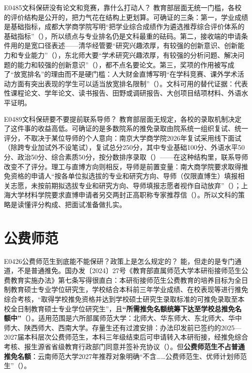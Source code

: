 \begin{qa}{E0485}{文科保研没有论文和竞赛，靠什么打动人？}
教育部层面无统一门槛，各校的评价结构是公开的，把力气花在结构上更划算。可确证的三条：第一，学业成绩是基础指标，成都大学商学院写明“把学业综合成绩作为遴选推荐综合评价体系的基础指标”（），所以绩点与专业排名仍是文科最重的砝码。第二，接收端的申请条件用的是宽口径表述——清华经管要“研究兴趣浓厚，有较强的创新意识、创新能力和专业能力”（），东北师大要“学术研究兴趣浓厚，有较强的分析问题、解决问题的能力和较强的创新意识”（），都不点名要论文。第三，奖项的作用被写成了“放宽排名”的理由而不是硬门槛：人大财金直博写明“在学科竞赛、课外学术活动方面有突出表现的学生可以适当放宽排名限制”（）。文科可用的替代证据：代表性课程论文、学年论文、读书报告、田野或调研报告、大创项目结项材料、外语水平证明。
\end{qa}

\begin{qa}{E0489}{文科保研要不要提前联系导师？}
教育部层面无规定，各校的录取机制决定了这件事的收益高低。可确证的是多数院系的推免录取由院系统一组织复试、统一评分，不取决于某位导师的个人意向：南京大学商学院2026年复试采用线下面试（除跨专业加试外不设笔试），复试总分250分，其中专业基础100分、外语水平50分、政治50分、综合素质50分，按分数排序录取（）——在这种结构里，联系导师改变不了评分。理工与直博方向则相反，导师是前置变量：南大商学院要求取得推免资格的申请人“按各单位拟选拔的专业和研究方向、导师（仅限直博生）填报相关志愿，未按前期拟选拔专业和研究方向、导师填报志愿者视作自动放弃”（）；上海大学材料学院要求直博申请者另交两封正高职称专家推荐信（）。所以文科的策略是读懂评分构成、把面试准备做扎实。
\end{qa}

\section{公费师范}
\begin{qa}{E0426}{公费师范生到底能不能保研？政策上是怎么规定的？}
能，但走的是专门通道，不是普通推免。国办发〔2024〕27号《教育部直属师范大学本研衔接师范生公费教育实施办法》第七条写得很直白：本研衔接师范生公费教育的培养目标为全日制教育硕士专业学位研究生，学校结合本科前三年学业成绩、在校表现等进行推免综合考核，“取得学校推免资格并达到学校硕士研究生录取标准的可推免录取至本校全日制教育硕士专业学位研究生”，且\textbf{“所需推免名额统筹下达至学校总推免名额中”}（）。适用范围是六所部属师范大学：北师大、华东师大、东北师大、华中师大、陕西师大、西南大学。存量生还有过渡安排：办法印发前已签约的2025—2027届本科层次公费师范生，本科三年级结束后可申请转入本研衔接，经推免综合考核、报生源省省级教育行政部门同意并签补充协议（）。但\textbf{公费师范生不占普通推免名额}：云南师范大学2027年推荐对象明确“不含……公费师范生、优师计划师范生”（）。
\end{qa}

